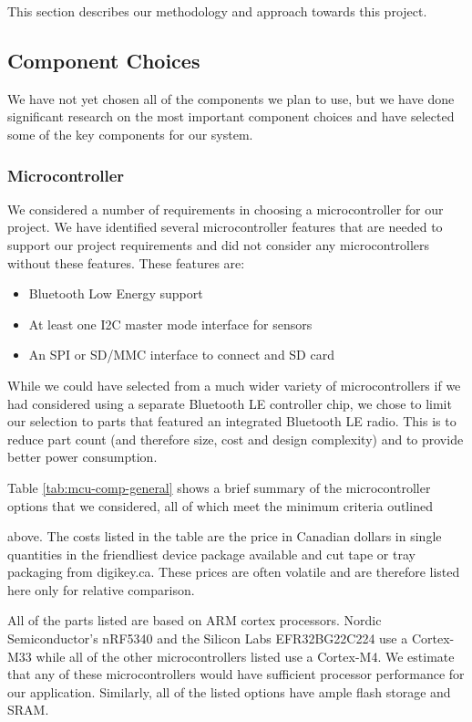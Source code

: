 This section describes our methodology and approach towards this project.

\subsection{Component Choices}

We have not yet chosen all of the components we plan to use, but we have done
significant research on the most important component choices and have selected
some of the key components for our system.

\subsubsection{Microcontroller}

We considered a number of requirements in choosing a microcontroller for our
project. We have identified several microcontroller features that are needed to
support our project requirements and did not consider any microcontrollers
without these features. These features are:
\begin{itemize}
    \item Bluetooth Low Energy support
    \item At least one I2C master mode interface for sensors
    \item An SPI or SD/MMC interface to connect and SD card
\end{itemize}

While we could have selected from a much wider variety of microcontrollers if we
had considered using a separate Bluetooth LE controller chip, we chose to limit
our selection to parts that featured an integrated Bluetooth LE radio. This is
to reduce part count (and therefore size, cost and design complexity) and to
provide better power consumption.

Table \ref{tab:mcu-comp-general} shows a brief summary of the microcontroller
options that we considered, all of which meet the minimum criteria outlined

above. The costs listed in the table are the price in Canadian dollars in single
quantities in the friendliest device package available and cut tape or tray
packaging from digikey.ca. These prices are often volatile and are therefore
listed here only for relative comparison.

All of the parts listed are based on ARM cortex processors. Nordic
Semiconductor's nRF5340 and the Silicon Labs EFR32BG22C224 use a Cortex-M33
while all of the other microcontrollers listed use a Cortex-M4. We estimate that
any of these microcontrollers would have sufficient processor performance for
our application. Similarly, all of the listed options have ample flash storage
and SRAM.


